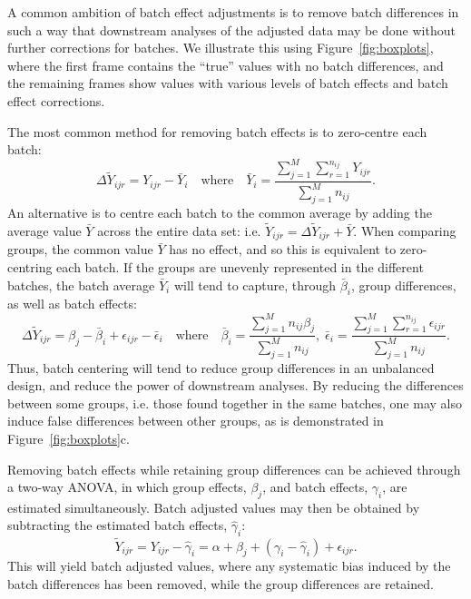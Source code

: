 \documentclass{bio}
\begin{document}
A common ambition of batch effect adjustments is to remove batch differences in such a way that downstream analyses of the adjusted data may be done without further corrections for batches. We illustrate this using Figure~\ref{fig:boxplots}, where the first frame contains the ``true'' values with no batch differences, and the remaining frames show values with various levels of batch effects and batch effect corrections.

The most common method for removing batch effects is to zero-centre each batch:
\begin{equation}
\Delta\widetilde Y_{ijr}=Y_{ijr}-\bar{Y}_{i}
\quad\text{where}\quad
\bar{Y}_i=\frac{\sum_{j=1}^M\sum_{r=1}^{n_{ij}} Y_{ijr}}{\sum_{j=1}^M n_{ij}}.
\end{equation}
An alternative is to centre each batch to the common average by adding the average value $\bar{Y}$ across the entire data set: i.e. $\widetilde Y_{ijr}=\Delta\widetilde Y_{ijr}+\bar{Y}$. When comparing groups, the common value $\bar{Y}$ has no effect, and so this is equivalent to zero-centring each batch. If the groups are unevenly represented in the different batches, the batch average $\bar{Y}_i$ will tend to capture, through $\bar\beta_i$, group differences, as well as batch effects:
\begin{equation}
\Delta\widetilde{Y}_{ijr}=\beta_j-\bar{\beta}_i+\epsilon_{ijr}-\bar{\epsilon}_i
\quad\text{where}\quad
\bar{\beta}_i=\frac{\sum_{j=1}^M n_{ij}\beta_j}{\sum_{j=1}^M n_{ij}},\;
\bar{\epsilon}_i=\frac{\sum_{j=1}^M\sum_{r=1}^{n_{ij}} \epsilon_{ijr}}{\sum_{j=1}^M n_{ij}}.
\end{equation}
Thus, batch centering will tend to reduce group differences in an unbalanced design, and reduce the power of downstream analyses. By reducing the differences between some groups, i.e. those found together in the same batches, one may also induce false differences between other groups, as is demonstrated in Figure~\ref{fig:boxplots}c.

Removing batch effects while retaining group differences can be achieved through a two-way ANOVA, in which group effects, $\beta_j$, and batch effects, $\gamma_i$, are estimated simultaneously. Batch adjusted values may then be obtained by subtracting the estimated batch effects, $\hat\gamma_i$:
\begin{equation}
\widetilde Y_{ijr}=Y_{ijr}-\hat\gamma_i=\alpha+\beta_j+(\gamma_i-\hat\gamma_i)+\epsilon_{ijr}.
\end{equation}
This will yield batch adjusted values, where any systematic bias induced by the batch differences has been removed, while the group differences are retained.
\end{document}

